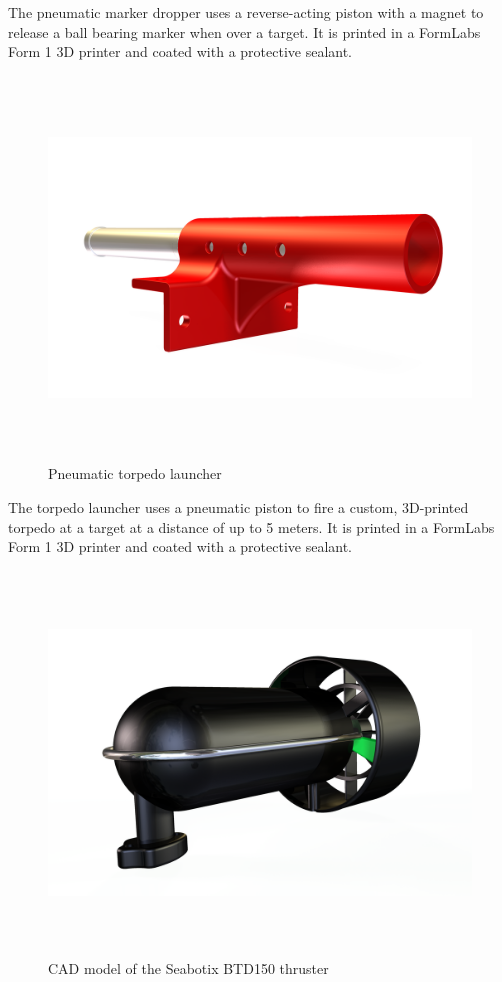 \documentclass[12pt, landscape]{article}
\begin{document}
The pneumatic marker dropper uses a reverse-acting piston with a magnet to release a ball bearing marker when over a target.  It is printed in a FormLabs Form 1 3D printer and coated with a protective sealant.

\begin{figure}[H]
\centering
\includegraphics[height=4in]{media/TORPEDO-RENDER-ALPHA.png}
\caption{Pneumatic torpedo launcher}
\label{torpedo}
\end{figure}

The torpedo launcher uses a pneumatic piston to fire a custom, 3D-printed torpedo at a target at a distance of up to 5 meters.  It is printed in a FormLabs Form 1 3D printer and coated with a protective sealant.

\begin{figure}[H]
\centering
\includegraphics[height=4in]{media/THRUSTER-RENDER-2-ALPHA.png}
\caption{CAD model of the Seabotix BTD150 thruster}
\label{thruster}
\end{figure}
\end{document}
